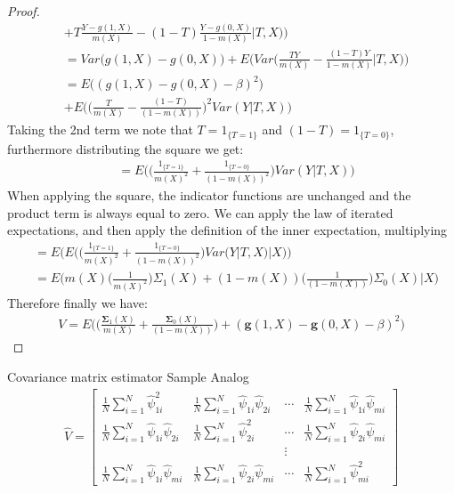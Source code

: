 \documentclass[12pt]{article}
\begin{document}
\begin{outline}[enumerate]
\begin{proof}
\begin{align*}
							&+ T\frac{Y-g(1,X)}{m(X)} - (1-T)\frac{Y-g(0,X)}{1-m(X)}|T,X\big)\Big)\\
							&= Var\Big(g(1,X)-g(0,X)\Big) + E\Big(Var\Big(\frac{TY}{m(X)} - \frac{(1-T)Y}{1-m(X)}|T,X\Big)\Big)\\
							&= E\Big((g(1,X)-g(0,X)-\beta)^2\Big) \\
							&+ E\Big(\Big(\frac{T}{m(X)}-\frac{(1-T)}{(1-m(X))}\Big)^2Var(Y|T,X)\Big)
						\end{align*}
						Taking the 2nd term we note that $T=1_{\{T=1\}}$ and $(1-T)= 1_{\{T=0\}}$, furthermore distributing the square we get:
						\begin{align*}
							&= E\Big(\Big(\frac{1_{\{T=1\}}}{m(X)^2}+\frac{1_{\{T=0\}}}{(1-m(X))^2}\Big)Var(Y|T,X)\Big)
						\end{align*}
						When applying the square, the indicator functions are unchanged and the product term is always equal to zero. We can apply the law of iterated expectations, and then apply the definition of the inner expectation, multiplying 
						\begin{align*}
							&= E\Big(E\Big(\Big(\frac{1_{\{T=1\}}}{m(X)^2}+\frac{1_{\{T=0\}}}{(1-m(X))^2}\Big)Var(Y|T,X)|X\Big)\Big)\\
							&=E\Big( m(X)\Big(\frac{1}{m(X)^2}\Big)\Sigma_1(X) + (1-m(X))\Big(\frac{1}{(1-m(X))}\Big)\Sigma_0(X)|X\Big)
						\end{align*}
						Therefore finally we have:
						\begin{align*}
							V = E\Big(\Big(\frac{\pmb{\Sigma}_1(X)}{m(X)}+\frac{\pmb{\Sigma}_0(X)}{(1-m(X))}\Big) + (\mathbf{g}(1,X)-\mathbf{g}(0,X)-\beta)^2\Big)
						\end{align*}
					\end{proof}
			\3 Covariance matrix estimator
				\4 Sample Analog 
					\begin{align*}
						\hat{V} = 
						\begin{bmatrix}
							\frac{1}{N}\sum_{i=1}^N \hat{\psi}_{1i}^2 	& \frac{1}{N}\sum_{i=1}^N \hat{\psi}_{1i}\hat{\psi}_{2i} & \cdots & \frac{1}{N}\sum_{i=1}^N \hat{\psi}_{1i}\hat{\psi}_{mi} \\
							\frac{1}{N}\sum_{i=1}^N \hat{\psi}_{1i}\hat{\psi}_{2i} & \frac{1}{N}\sum_{i=1}^N \hat{\psi}_{2i}^2 	& \cdots  & \frac{1}{N}\sum_{i=1}^N \hat{\psi}_{2i}\hat{\psi}_{mi} \\
							&			  	  &	\vdots & \\
							\frac{1}{N}\sum_{i=1}^N \hat{\psi}_{1i}\hat{\psi}_{mi} & \frac{1}{N}\sum_{i=1}^N \hat{\psi}_{2i}\hat{\psi}_{mi} & \cdots & \frac{1}{N}\sum_{i=1}^N \hat{\psi}_{mi}^2

\end{bmatrix}
\end{align*}
\end{outline}
\end{document}
